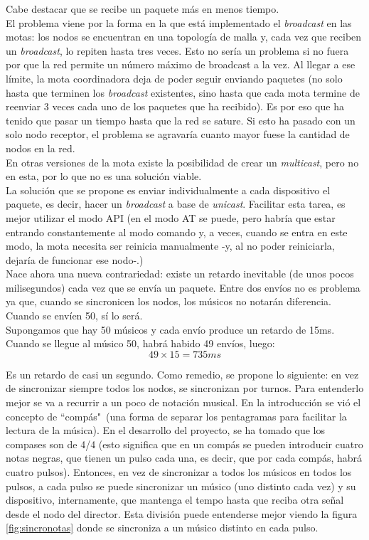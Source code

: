Cabe destacar que se recibe un paquete más en menos tiempo.\\

El problema viene por la forma en la que está implementado el \textit{broadcast} en las motas:
los nodos se encuentran en una topología de malla y, cada vez que reciben un \textit{broadcast},
lo repiten hasta tres veces. Esto no sería un problema si no fuera por que la red
permite un número máximo de broadcast a la vez. Al llegar a ese límite, la mota
coordinadora deja de poder seguir enviando paquetes (no solo hasta que terminen los
\textit{broadcast} existentes, sino hasta que cada mota termine de reenviar 3 veces
cada uno de los paquetes que ha recibido). Es por eso que ha tenido que pasar un tiempo
hasta que la red se sature. Si esto ha pasado con un solo nodo receptor, el problema
se agravaría cuanto mayor fuese la cantidad de nodos en la red. \\

En otras versiones de la mota existe la posibilidad de crear un \textit{multicast},
pero no en esta, por lo que no es una solución viable.\\

La solución que se propone es enviar individualmente a cada dispositivo el paquete, es decir,
hacer un \textit{broadcast} a base de \textit{unicast}. Facilitar esta tarea, es mejor
utilizar el modo API (en el modo AT se puede, pero habría que estar entrando constantemente
al modo comando y, a veces, cuando se entra en este modo, la mota necesita ser reinicia manualmente -y,
al no poder reiniciarla, dejaría de funcionar ese nodo-.)\\

Nace ahora una nueva contrariedad: existe un retardo inevitable (de unos pocos milisegundos)
cada vez que se envía un paquete. Entre dos envíos no es problema ya que, cuando
se sincronicen los nodos, los músicos no notarán diferencia. Cuando se envíen 50, sí lo será.\\

Supongamos que hay 50 músicos y cada envío produce un retardo de 15ms. Cuando se llegue al músico
50, habrá habido 49 envíos, luego:
\[
  49 \times 15 = 735ms
\]

Es un retardo de casi un segundo. Como remedio, se propone lo siguiente: en vez de
sincronizar siempre todos los nodos, se sincronizan por turnos. Para entenderlo mejor se
va a recurrir a un poco de notación musical. En la introducción se vió el concepto de ``compás"\
(una forma de separar los pentagramas para facilitar la lectura de la música). En el desarrollo
del proyecto, se ha tomado que los compases son de 4/4 (esto significa que en un compás se pueden introducir
cuatro notas negras, que tienen un pulso cada una, es decir, que por cada compás,
habrá cuatro pulsos). Entonces, en vez de sincronizar a todos los músicos en todos los pulsos,
a cada pulso se puede sincronizar un músico (uno distinto cada vez) y su dispositivo, internamente, que mantenga el tempo hasta
que reciba otra señal desde el nodo del director. Esta división puede entenderse mejor viendo
la figura \ref{fig:sincronotas} donde se sincroniza a un músico distinto en cada pulso.


